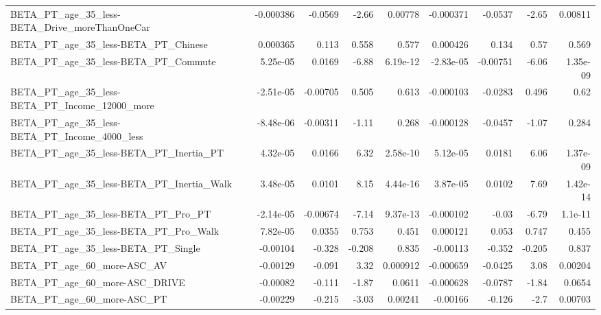 \begin{tabular}{lrrrrrrrr}
BETA\_PT\_age\_35\_less-BETA\_Drive\_moreThanOneCar      &   -0.000386 &      -0.0569 &    -2.66 &  0.00778 &  -0.000371 &     -0.0537 &        -2.65 &       0.00811 \\
BETA\_PT\_age\_35\_less-BETA\_PT\_Chinese                &    0.000365 &        0.113 &    0.558 &    0.577 &   0.000426 &       0.134 &         0.57 &         0.569 \\
BETA\_PT\_age\_35\_less-BETA\_PT\_Commute                &    5.25e-05 &       0.0169 &    -6.88 & 6.19e-12 &  -2.83e-05 &    -0.00751 &        -6.06 &      1.35e-09 \\
BETA\_PT\_age\_35\_less-BETA\_PT\_Income\_12000\_more      &   -2.51e-05 &     -0.00705 &    0.505 &    0.613 &  -0.000103 &     -0.0283 &        0.496 &          0.62 \\
BETA\_PT\_age\_35\_less-BETA\_PT\_Income\_4000\_less       &   -8.48e-06 &     -0.00311 &    -1.11 &    0.268 &  -0.000128 &     -0.0457 &        -1.07 &         0.284 \\
BETA\_PT\_age\_35\_less-BETA\_PT\_Inertia\_PT             &    4.32e-05 &       0.0166 &     6.32 & 2.58e-10 &   5.12e-05 &      0.0181 &         6.06 &      1.37e-09 \\
BETA\_PT\_age\_35\_less-BETA\_PT\_Inertia\_Walk           &    3.48e-05 &       0.0101 &     8.15 & 4.44e-16 &   3.87e-05 &      0.0102 &         7.69 &      1.42e-14 \\
BETA\_PT\_age\_35\_less-BETA\_PT\_Pro\_PT                 &   -2.14e-05 &     -0.00674 &    -7.14 & 9.37e-13 &  -0.000102 &       -0.03 &        -6.79 &       1.1e-11 \\
BETA\_PT\_age\_35\_less-BETA\_PT\_Pro\_Walk               &    7.82e-05 &       0.0355 &    0.753 &    0.451 &   0.000121 &       0.053 &        0.747 &         0.455 \\
BETA\_PT\_age\_35\_less-BETA\_PT\_Single                 &    -0.00104 &       -0.328 &   -0.208 &    0.835 &   -0.00113 &      -0.352 &       -0.205 &         0.837 \\
BETA\_PT\_age\_60\_more-ASC\_AV                         &    -0.00129 &       -0.091 &     3.32 & 0.000912 &  -0.000659 &     -0.0425 &         3.08 &       0.00204 \\
BETA\_PT\_age\_60\_more-ASC\_DRIVE                      &    -0.00082 &       -0.111 &    -1.87 &   0.0611 &  -0.000628 &     -0.0787 &        -1.84 &        0.0654 \\
BETA\_PT\_age\_60\_more-ASC\_PT                         &    -0.00229 &       -0.215 &    -3.03 &  0.00241 &   -0.00166 &      -0.126 &         -2.7 &       0.00703 \\

\end{tabular}
